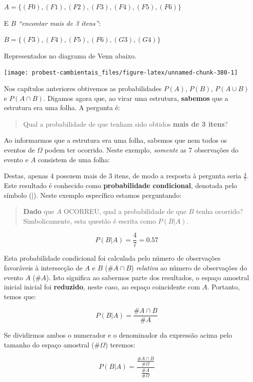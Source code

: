 \documentclass[
]{book}
\begin{document}
\(A = \{(F0), (F1), (F2), (F3), (F4), (F5), (F6)\}\)

E \(B\) \emph{``encontar mais de 3 itens''}:

\(B = \{(F3), (F4), (F5), (F6), (G3), (G4)\}\)

Representados no diagrama de Venn abaixo.

\begin{center}\texttt{[image: probest-cambientais\_files/figure-latex/unnamed-chunk-380-1]} \end{center}

Nos capítulos anteriores obtivemos as probabilidades \(P(A)\), \(P(B)\), \(P(A \cup B)\) e \(P(A \cap B)\). Digamos agora que, ao virar uma estrutura, \textbf{sabemos} que a estrutura era uma folha. A pergunta é:

\begin{quote}
Qual a probabilidade de que tenham sido obtidos \textbf{mais de 3 itens}?
\end{quote}

Ao informarmos que a estrutura era uma folha, sabemos que nem todos os eventos de \(\Omega\) podem ter ocorrido. Neste exemplo, \emph{somente} as 7 observações do evento e \(A\) consistem de uma folha:

Destas, apenas 4 possuem mais de 3 itens, de modo a resposta à pergunta seria \(\frac{4}{7}\). Este resultado é conhecido como \textbf{probabilidade condicional}, denotada pelo símbolo (\(|\)). Neste exemplo específico estamos perguntando:

\begin{quote}
\textbf{Dado} que \(A\) OCORREU, qual a probabilidade de que \(B\) tenha ocorrido? Simbolicamente, esta questão é escrita como \(P(B|A)\).
\end{quote}

\[P(B|A) = \frac{4}{7} = 0.57\]

Esta probabilidade condicional foi calculada pelo número de observações favoráveis à intersecção de \(A\) e \(B\) (\(\#A \cap B\)) \emph{relativa} ao número de observações do evento \(A\) (\(\#A\)). Isto significa ao sabermos parte dos resultados, o espaço amostral inicial inicial foi \textbf{reduzido}, neste caso, ao espaço coincidente com \(A\). Portanto, temos que:

\[P(B|A) = \frac{\#A \cap B}{\#A}\]

Se dividirmos ambos o numerador e o denominador da expressão acima pelo tamanho do espaço amostral (\(\#\Omega\)) teremos:

\[P(B|A) = \frac{\frac{\#A \cap B}{\#\Omega}}{\frac{\#A}{\#\Omega}}\]
\end{document}
